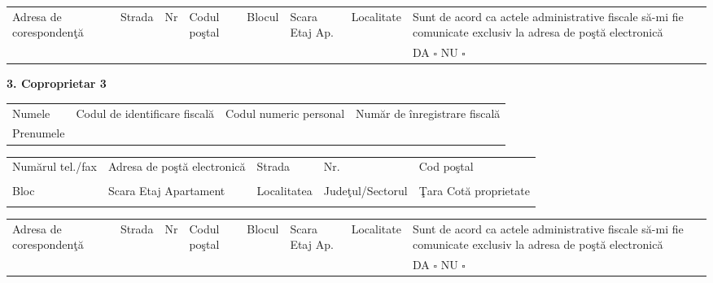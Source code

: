 \documentclass[10pt,a4paper,landscape]{article}
\newcommand{\fillline}[1][6cm]{\underline{\hspace{#1}}}
\newcommand{\checkboxempty}{$\square$}
\begin{document}
\begin{tabularx}{\textwidth}{|m{2.5cm}|X|X|X|X|X|X|m{4cm}|}
\hline
\multirow{2}{2.5cm}{Adresa de corespondenţă} & Strada & Nr & Codul poştal & Blocul & Scara \quad Etaj \quad Ap. & Localitate & Sunt de acord ca actele administrative fiscale să-mi fie comunicate exclusiv la adresa de poştă electronică \\
& \fillline[2cm] & \fillline[1cm] & \fillline[1.5cm] & \fillline[1cm] & \fillline[2cm] & \fillline[2cm] & DA \checkboxempty \hspace{0.5cm} NU \checkboxempty \\
\hline
\end{tabularx}

\vspace{0.3cm}

\textbf{3. Coproprietar 3}\\
\begin{tabularx}{\textwidth}{|X|X|X|X|}
\hline
Numele \fillline[5cm] & Codul de identificare fiscală & Codul numeric personal & Număr de înregistrare fiscală \\
Prenumele \fillline[5cm] & \fillline[4cm] & \fillline[4cm] & \fillline[4cm] \\
\hline
\end{tabularx}

\begin{tabularx}{\textwidth}{|X|X|X|X|X|}
\hline
Numărul tel./fax & Adresa de poştă electronică & Strada & Nr. & Cod poştal \\
\fillline[3cm] & \fillline[4cm] & \fillline[4cm] & \fillline[1.5cm] & \fillline[2cm] \\
\hline
Bloc & Scara \quad Etaj \quad Apartament & Localitatea & Judeţul/Sectorul & Ţara \quad Cotă proprietate \\
\fillline[1.5cm] & \fillline[3cm] & \fillline[3cm] & \fillline[3cm] & \fillline[3cm] \\
\hline
\end{tabularx}

\begin{tabularx}{\textwidth}{|m{2.5cm}|X|X|X|X|X|X|m{4cm}|}
\hline
\multirow{2}{2.5cm}{Adresa de corespondenţă} & Strada & Nr & Codul poştal & Blocul & Scara \quad Etaj \quad Ap. & Localitate & Sunt de acord ca actele administrative fiscale să-mi fie comunicate exclusiv la adresa de poştă electronică \\
& \fillline[2cm] & \fillline[1cm] & \fillline[1.5cm] & \fillline[1cm] & \fillline[2cm] & \fillline[2cm] & DA \checkboxempty \hspace{0.5cm} NU \checkboxempty \\
\hline
\end{tabularx}
\end{document}

